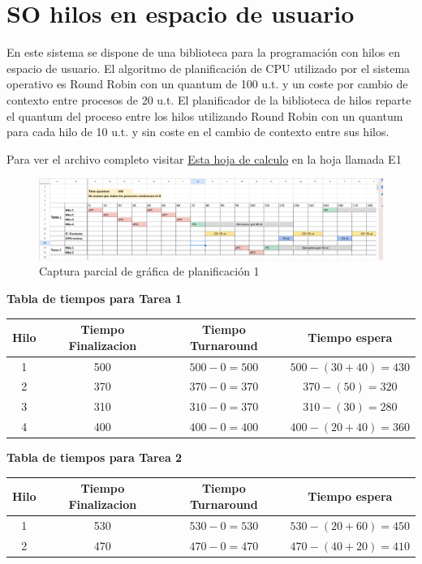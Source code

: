 \documentclass{article}
\begin{document}
\newpage

\section{SO hilos en espacio de usuario}
En este sistema se dispone de
una biblioteca para la programación con hilos en espacio de usuario. El algoritmo de
planificación de CPU utilizado por el sistema operativo es Round Robin con un quantum de 100
u.t. y un coste por cambio de contexto entre procesos de 20 u.t. El planificador de la biblioteca
de hilos reparte el quantum del proceso entre los hilos utilizando Round Robin con un quantum
para cada hilo de 10 u.t. y sin coste en el cambio de contexto entre sus hilos.

Para ver el archivo completo visitar \href{https://docs.google.com/spreadsheets/d/1Rp1qp1uHB0s8WWKpClNhiJQQU-BFLd2jRRI6iWhH4GQ/edit?usp=sharing}{Esta hoja de calculo} 
en la hoja llamada E1 
\begin{figure}[h]
\caption{Captura parcial de gráfica de planificación 1}
\centering
\includegraphics[scale=0.25,clip]{test1.png}
\end{figure}

\begin{center} \textbf{Tabla de tiempos para Tarea 1}
	\newline
	\newline
	\begin{tabular}{||c c c c||} 
	 \hline
	 Hilo & Tiempo Finalizacion & Tiempo Turnaround & Tiempo espera \\ [0.5ex] 
	 \hline\hline
	 1 & 500 & $500 - 0 = 500$ & $500 - (30 + 40) = 430$  \\ 
	 \hline
	 2 & 370 & $370 - 0 = 370$ & $370 - (50) = 320$ \\
	 \hline
	 3 & 310 & $310 - 0 = 370$  & $310 - (30) = 280$ \\
	 \hline
	 4 & 400 & $400 - 0 = 400$ & $400 - (20 + 40) = 360$ \\
	 \hline
	\end{tabular}
\end{center}

\begin{center} \textbf{Tabla de tiempos para Tarea 2}
	\newline
	\newline
	\begin{tabular}{||c c c c||} 
	 \hline
	 Hilo & Tiempo Finalizacion & Tiempo Turnaround & Tiempo espera \\ [0.5ex] 
	 \hline\hline
	 1 & 530 & $530 - 0 = 530$ & $530 - (20 + 60) = 450$  \\ 
	 \hline
	 2 & 470 & $470 - 0 = 470$ & $470 - (40 + 20) = 410$ \\
	\end{tabular}
\end{center}
\end{document}
